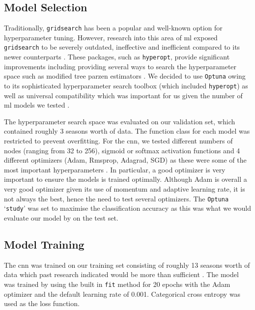 \documentclass{article}
\newcommand{\sw}[1]{\texttt{#1}}
\begin{document}
\subsection{Model Selection}
\label{modelselection}

Traditionally, \sw{gridsearch} has been a popular and well-known option for hyperparameter tuning. However, research into this area of \gls{ml} exposed \sw{gridsearch} to be severely outdated, ineffective and inefficient compared to its newer counterparts \cite{hyperparamreview}. These packages, such as \sw{hyperopt}, provide significant improvements including providing several ways to search the hyperparameter space such as modified tree parzen estimators \cite{hyperopt}. We decided to use \sw{Optuna} owing to its sophisticated hyperparameter search toolbox (which included \sw{hyperopt}) as well as universal compatibility which was important for us given the number of \gls{ml} models we tested \cite{optuna}.  

The hyperparameter search space was evaluated on our validation set, which contained roughly 3 seasons worth of data. The function class for each model was restricted to prevent overfitting. For the \gls{cnn}, we tested different numbers of nodes (ranging from 32 to 256), sigmoid or softmax activation functions and 4 different optimizers (Adam, Rmsprop, Adagrad, SGD) as these were some of the most important hyperparameters \cite{laumediumCNNtuning}. In particular, a good optimizer is very important to ensure the models is trained optimally. Although Adam is overall a very good optimizer given its use of momentum and adaptive learning rate, it is not always the best, hence the need to test several optimizers. The \sw{Optuna} ‘\sw{study}’ was set to maximise the classification accuracy as this was what we would evaluate our model by on the test set. 

\addtolength{\headsep}{-5mm}
\subsection{Model Training}
\label{modeltraining}

\vspace{-0.6em}
The \gls{cnn} was trained on our training set consisting of roughly 13 seasons worth of data which past research indicated would be more than sufficient \cite{horvat2020use}. The model was trained by using the built in \sw{fit} method for 20 epochs with the Adam optimizer and the default learning rate of 0.001. Categorical cross entropy was used as the loss function.
\end{document}
